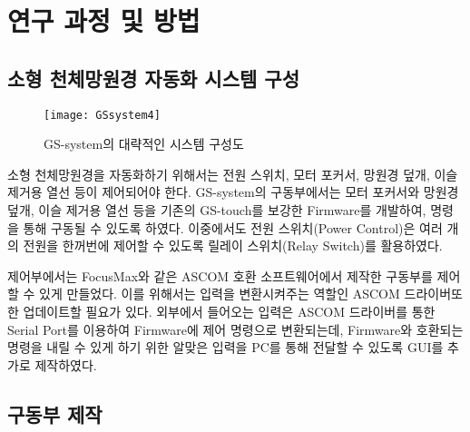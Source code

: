
\section{연구 과정 및 방법}


\subsection{소형 천체망원경 자동화 시스템 구성}




\begin{figure}[h]
	\begin{center}
		\texttt{[image: GSsystem4]}
	\end{center}
	\caption{GS-system의 대략적인 시스템 구성도}
	\label{GSsystem}
\end{figure}

소형 천체망원경을 자동화하기 위해서는 전원 스위치, 모터 포커서, 망원경 덮개, 이슬 제거용 열선 등이  제어되어야 한다. GS-system의 구동부에서는 모터 포커서와 망원경 덮개, 이슬 제거용 열선 등을 기존의 GS-touch를 보강한 Firmware를 개발하여, 명령을 통해 구동될 수 있도록 하였다. 이중에서도 전원 스위치(Power Control)은 여러 개의 전원을 한꺼번에 제어할 수 있도록 릴레이 스위치(Relay Switch)를 활용하였다.

제어부에서는 FocusMax와 같은 ASCOM 호환 소프트웨어에서 제작한 구동부를 제어할 수 있게 만들었다. 이를  위해서는 입력을 변환시켜주는 역할인 ASCOM 드라이버또한 업데이트할 필요가 있다. 외부에서 들어오는 입력은 ASCOM 드라이버를 통한 Serial Port를 이용하여 Firmware에 제어 명령으로 변환되는데, Firmware와 호환되는 명령을 내릴 수 있게 하기 위한 알맞은 입력을 PC를 통해 전달할 수 있도록 GUI를 추가로 제작하였다.



\subsection{구동부 제작}



